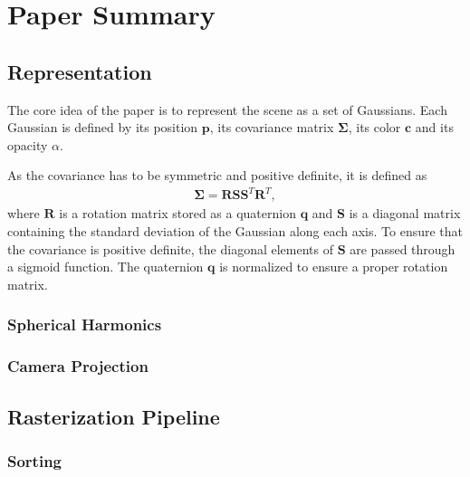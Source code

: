 

\section{Paper Summary}

\subsection{Representation}
The core idea of the paper is to represent the scene as a set of Gaussians.
Each Gaussian is defined by its position $\bm{p}$, its covariance matrix $\bm{\Sigma}$, its color $\bm{c}$ and its opacity $\alpha$.

As the covariance has to be symmetric and positive definite, it is defined as
\begin{align}
    \bm{\Sigma} = \bm{R} \bm{S} \bm{S}^T \bm{R}^T,
\end{align}
where $\bm{R}$ is a rotation matrix stored as a quaternion $\bm{q}$ and $\bm{S}$ is a diagonal matrix containing the standard deviation of the Gaussian along each axis.
To ensure that the covariance is positive definite, the diagonal elements of $\bm{S}$ are passed through a sigmoid function.
The quaternion $\bm{q}$ is normalized to ensure a proper rotation matrix.



\subsubsection{Spherical Harmonics}


\subsubsection{Camera Projection}

\subsection{Rasterization Pipeline}
\label{sec:rasterization}
\subsubsection{Sorting}
